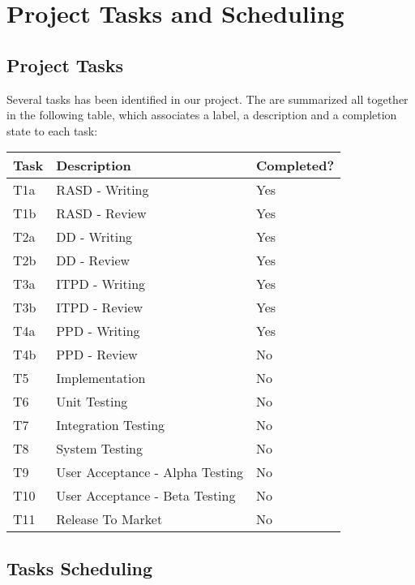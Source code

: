 \section{Project Tasks and Scheduling}
%
\subsection{Project Tasks}
Several tasks has been identified in our project.
The are summarized all together in the following table, which associates a label, a description and a completion state to each task:
\begin{center}
	\begin{tabulary}{\linewidth\tymin=70pt}{Y{2cm}|Y{6cm}|Y{2.25cm}}
		\textbf{Task} & \textbf{Description} & \textbf{Completed?}\\ \hline
		T1a & RASD - Writing & Yes \\ \hline
		T1b & RASD - Review & Yes \\ \hline
		T2a & DD - Writing & Yes \\ \hline
		T2b & DD - Review & Yes \\ \hline
		T3a & ITPD - Writing & Yes \\ \hline
		T3b & ITPD - Review & Yes \\ \hline
		T4a & PPD - Writing & Yes \\ \hline
		T4b & PPD - Review & No \\ \hline
		T5 & Implementation & No \\ \hline
		T6 & Unit Testing & No \\ \hline
		T7 & Integration Testing & No \\ \hline
		T8 & System Testing & No \\ \hline
		T9 & User Acceptance - Alpha Testing & No \\ \hline
		T10 & User Acceptance - Beta Testing & No \\ \hline
		T11 & Release To Market & No \\
	\end{tabulary}
\end{center}
%
\subsection{Tasks Scheduling}
\lipsum[100]
%
